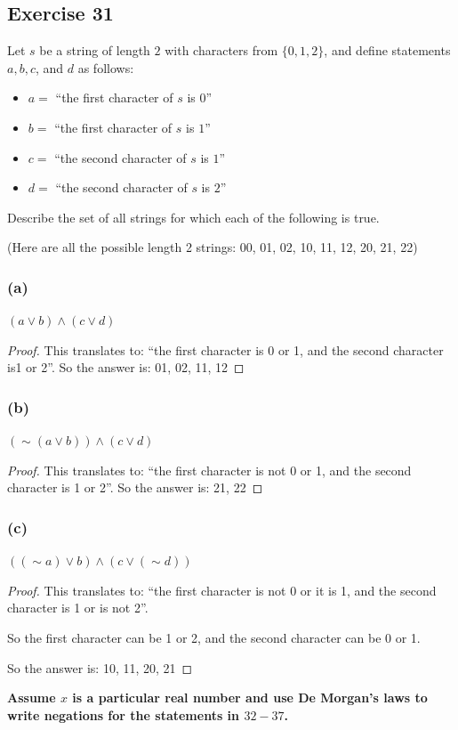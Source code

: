 \documentclass[14pt]{extarticle}
\begin{document}
\subsection{Exercise 31} Let $s$ be a string of length $2$ with characters from
$\{0, 1, 2\}$, and define statements $a, b, c$, and $d$ as follows:

\begin{itemize} \item $a = $ ``the first character of $s$ is $0$'' \item $b = $
``the first character of $s$ is $1$'' \item $c = $ ``the second character of $s$
is $1$'' \item $d = $ ``the second character of $s$ is $2$'' \end{itemize}

Describe the set of all strings for which each of the following is true.

(Here are all the possible length 2 strings: 00, 01, 02, 10, 11, 12, 20, 21, 22)
\subsubsection{(a)} $(a \vee b) \wedge (c \vee d)$

\begin{proof} This translates to: ``the first character is 0 or 1, and the
second character is1 or 2''. So the answer is: 01, 02, 11, 12 \end{proof}

\subsubsection{(b)} $({\sim(a \vee b)}) \wedge (c \vee d)$
\begin{proof} This translates to: ``the first character is not 0 or 1, and the
second character is 1 or 2''. So the answer is: 21, 22 \end{proof}

\subsubsection{(c)} $(({\sim a}) \vee b) \wedge (c \vee ({\sim d}))$
\begin{proof} This translates to: ``the first character is not 0 or it is 1, and
the second character is 1 or is not 2''.

So the first character can be 1 or 2, and the second character can be 0 or 1.

So the answer is: 10, 11, 20, 21 \end{proof}
{\bf Assume $x$ is a particular real number and use De Morgan’s laws to write
negations for the statements in $32-37$.}
\end{document}

